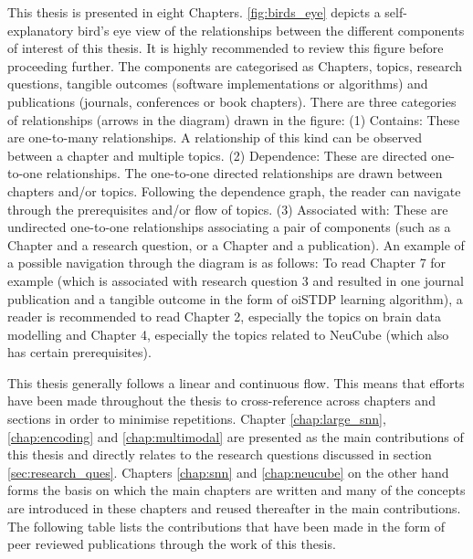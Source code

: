 This thesis is presented in eight Chapters. \figurename \ref{fig:birds_eye} depicts a self-explanatory bird's eye view of the relationships between the different components of interest of this thesis. It is highly recommended to review this figure before proceeding further. The components are categorised as Chapters, topics, research questions, tangible outcomes (software implementations or algorithms) and publications (journals, conferences or book chapters). There are three categories of relationships (arrows in the diagram) drawn in the figure: (1) Contains: These are one-to-many relationships. A relationship of this kind can be observed between a chapter and multiple topics. (2) Dependence: These are directed one-to-one relationships. The one-to-one directed relationships are drawn between chapters and/or topics. Following the dependence graph, the reader can navigate through the prerequisites and/or flow of topics. (3) Associated with: These are undirected one-to-one relationships associating a pair of components (such as a Chapter and a research question, or a Chapter and a publication). An example of a possible navigation through the diagram is as follows: To read Chapter 7 for example (which is associated with research question 3 and resulted in one journal publication and a tangible outcome in the form of oiSTDP learning algorithm), a reader is recommended to read Chapter 2, especially the topics on brain data modelling and Chapter 4, especially the topics related to NeuCube (which also has certain prerequisites).

This thesis generally follows a linear and continuous flow. This means that efforts have been made throughout the thesis to cross-reference across chapters and sections in order to minimise repetitions. Chapter \ref{chap:large_snn}, \ref{chap:encoding} and \ref{chap:multimodal} are presented as the main contributions of this thesis and directly relates to the research questions discussed in section \ref{sec:research_ques}. Chapters \ref{chap:snn} and \ref{chap:neucube} on the other hand forms the basis on which the main chapters are written and many of the concepts are introduced in these chapters and reused thereafter in the main contributions. The following table lists the contributions that have been made in the form of peer reviewed publications through the work of this thesis. 
 
